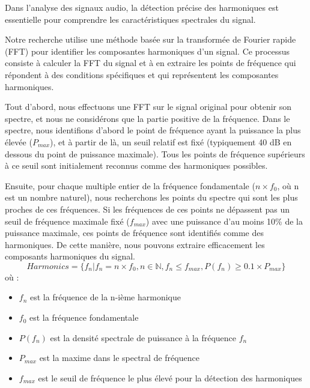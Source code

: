 Dans l'analyse des signaux audio, la détection précise des harmoniques est essentielle pour comprendre les caractéristiques spectrales du signal.

Notre recherche utilise une méthode basée sur la transformée de Fourier rapide (FFT) pour identifier les composantes harmoniques d'un signal. Ce processus consiste à calculer la FFT du signal et à en extraire les points de fréquence qui répondent à des conditions spécifiques et qui représentent les composantes harmoniques.

Tout d'abord, nous effectuons une FFT sur le signal original pour obtenir son spectre, et nous ne considérons que la partie positive de la fréquence. Dans le spectre, nous identifions d'abord le point de fréquence ayant la puissance la plus élevée (\(P_{max}\)), et à partir de là, un seuil relatif est fixé (typiquement 40 dB en dessous du point de puissance maximale). Tous les points de fréquence supérieurs à ce seuil sont initialement reconnus comme des harmoniques possibles.

Ensuite, pour chaque multiple entier de la fréquence fondamentale (\(n \times f_0 \), où n est un nombre naturel), nous recherchons les points du spectre qui sont les plus proches de ces fréquences. Si les fréquences de ces points ne dépassent pas un seuil de fréquence maximale fixé (\(f_{max}\)) avec une puissance d'au moins 10\% de la puissance maximale, ces points de fréquence sont identifiés comme des harmoniques. De cette manière, nous pouvons extraire efficacement les composants harmoniques du signal.
\begin{equation}
    Harmonics = \{f_n | f_n = n \times f_0, n \in \mathbb{N}, f_n \leq f_{max}, P(f_n) \geq 0.1 \times P_{max} \}
\end{equation}
où :
\begin{itemize}
    \item \(f_n\) est la fréquence de la n-ième harmonique
    \item \(f_0\) est la fréquence fondamentale
    \item \(P(f_n)\) est la densité spectrale de puissance à la fréquence \(f_n\)
    \item \(P_{max}\) est la maxime dans le spectral de fréquence 
    \item \(f_{max}\) est le seuil de fréquence le plus élevé pour la détection des harmoniques
\end{itemize}
